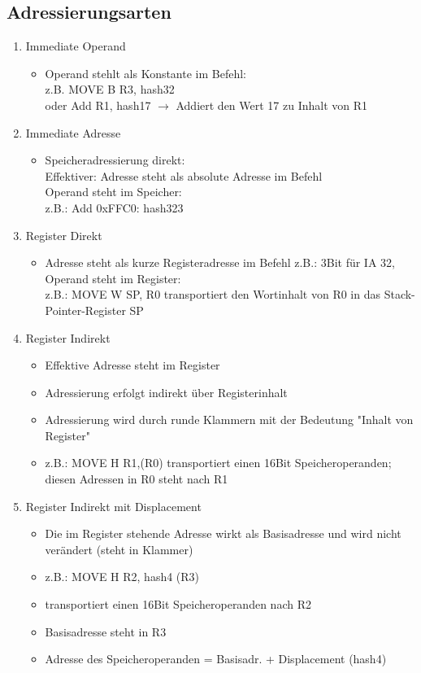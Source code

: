 \subsection{Adressierungsarten}
\begin{enumerate}
	\item Immediate Operand
	\begin{itemize}
		\item Operand stehlt als Konstante im Befehl: \\
		z.B. MOVE B R3, hash32\\
		oder Add R1, hash17 \(\to\) Addiert den Wert 17 zu Inhalt von R1
	\end{itemize}
	\item Immediate Adresse
	\begin{itemize}
		\item Speicheradressierung direkt: \\
		Effektiver: Adresse steht als absolute Adresse im Befehl \\
		Operand steht im Speicher:\\
		z.B.: Add 0xFFC0: hash323 
	\end{itemize}
	\item Register Direkt
	\begin{itemize}
		\item Adresse steht als kurze Registeradresse im Befehl 
		z.B.: 3Bit für IA 32, Operand steht im Register: \\
		z.B.: MOVE W SP, R0 transportiert den Wortinhalt von R0 in das Stack-Pointer-Register SP
	\end{itemize}
	\item Register Indirekt
	\begin{itemize}
		\item Effektive Adresse steht im Register
		\item Adressierung erfolgt indirekt über Registerinhalt
		\item Adressierung wird durch runde Klammern mit der Bedeutung "Inhalt von Register"
		\item z.B.: MOVE H R1,(R0)  transportiert einen 16Bit Speicheroperanden; diesen Adressen in R0 steht nach R1
	\end{itemize}
	\item Register Indirekt mit Displacement
	\begin{itemize}
		\item Die im Register stehende Adresse wirkt als Basisadresse und wird nicht verändert (steht in Klammer) 
		\item z.B.: MOVE H R2, hash4 (R3)
		\item transportiert einen 16Bit Speicheroperanden nach R2
		\item Basisadresse steht in R3
		\item Adresse des Speicheroperanden = Basisadr. + Displacement (hash4)
	\end{itemize}
\end{enumerate}

